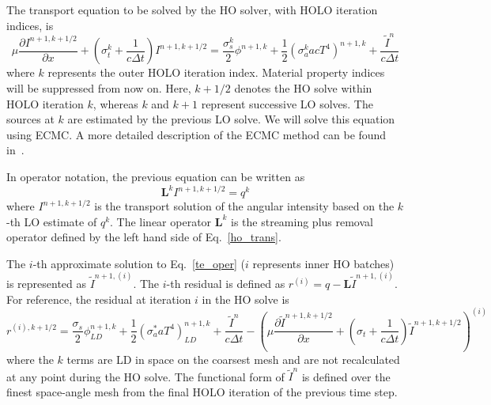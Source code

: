 \documentclass{mc2013}
\newcommand{\pderiv}[2]{\frac{\partial #1}{\partial #2}}
\newcommand{\B}[1]{\ensuremath{\mathbf{#1}}}
\begin{document}
The transport equation to be solved by the HO solver, with HOLO iteration indices, is
\begin{equation}
\mu \pderiv{I^{n+1,k+1/2}}{x} + \left(\sigma_t^k + \frac{1}{c \Delta t }\right)
I^{n+1,k+1/2}
= \frac{\sigma_s^k}{2} \phi^{n+1,k} +\frac{1}{2} \left(\sigma_a^k a c T^4
\right)^{n+1,k} + \frac{\tilde I^n}{c\Delta t} 
\end{equation}
where $k$ represents the outer HOLO iteration index.  Material property indices will be
suppressed from now on.  Here, $k+1/2$ denotes the
HO solve within HOLO iteration $k$, whereas $k$ and $k+1$ represent successive LO
solves. The sources at $k$ are estimated by the previous LO solve.  We will solve
this equation using ECMC.  A more detailed description of the
ECMC method can be found in~\cite{jake_thesis}. 

 In operator notation, the previous equation can be written as
\begin{equation}\label{te_oper}
\B L^k I^{n+1,k+1/2}  = q^{k}
\end{equation}
where $I^{n+1,k+1/2}$ is the transport solution of the angular intensity based on the
$k$-th LO estimate of $q^k$.
The linear operator $\B L^k$ is the streaming plus
removal operator defined by the left hand
side of Eq.~\eqref{ho_trans}.

The $i$-th approximate solution to Eq.~\eqref{te_oper} ($i$ represents inner HO
batches) is represented as
$\tilde{I}^{n+1,(i)}$.    
The $i$-th residual is defined as $r^{(i)} = q - \B L\tilde{I}^{n+1,(i)}.$ 
For reference, the residual at iteration $i$ in the HO solve
is
\begin{equation}
r^{(i),k+1/2} = \frac{\sigma_s}{2} \phi_{LD}^{n+1,k} +\frac{1}{2} \left(\sigma_a^* a T^4
\right)_{LD}^{n+1,k} + \frac{\tilde{I}^n}{c \Delta t } -
\left(\mu \pderiv{\tilde{I}^{n+1,k+1/2}}{x} +
\left(\sigma_t + \frac{1}{c \Delta t }\right) \tilde{I}^{n+1,k+1/2}\right)^{(i)}
\end{equation}
where the $k$ terms are LD in space on the coarsest mesh and are not recalculated at any point during
the HO solve.  The functional form of $\tilde{I}^n$ is defined over the finest
space-angle mesh from the final HOLO iteration of the previous time step.  
\end{document}
